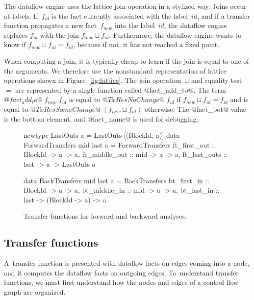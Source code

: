 \documentclass[blockstyle,preprint,nocopyrightspace]{sigplanconf}
\newcommand\join{\sqcup}
\newcommand\seclabel[1]{\label{sec:#1}}
\newcommand\figref[1]{Figure~\ref{fig:#1}}
\newcommand\figlabel[1]{\label{fig:#1}}
\begin{document}
The dataflow engine uses the lattice join operation in a stylized way.
Joins occur at labels.
If~$f_{\mathit{id}}$ is the fact currently associated with the
label~$\mathit{id}$, 
and if a transfer function propagates a new fact~$f_{\mathit{new}}$
into the label~$\mathit{id}$, 
the dataflow engine replaces $f_{\mathit{id}}$ with
the join  $f_{\mathit{new}} \join f_{\mathit{id}}$.
Furthermore, the dataflow engine wants to know if
  $f_{\mathit{new}} \join f_{\mathit{id}} = f_{\mathit{id}}$,
because if not, it has not reached a fixed point.

When computing a join, 
it is typically cheap to learn if the join
is equal to one of the arguments.
We therefore use the nonstandard representation of lattice operations
shown in \figref{lattice}.
The join operation~$\join$ and equality test~$=$ are represented by a
single function called @fact_add_to@.
The term $@fact_add_to@\;f_{\mathit{new}}\;f_{\mathit{id}}$ is equal to
$@TxRes NoChange@\; f_{\mathit{id}}$ if $f_{\mathit{new}} \join f_{\mathit{id}} = f_{\mathit{id}}$
and is equal to
$@TxRes SomeChange@\; (f_{\mathit{new}} \join f_{\mathit{id}})$ otherwise.
The @fact_bot@ value is the bottom element, 
and @fact_name@  is used for debugging.

\begin{figure}
\begin{code}
newtype LastOuts a = LastOuts [(BlockId, a)]
data ForwardTransfers mid last a = ForwardTransfers
 {ft_first_out  :: BlockId -> a -> a,
  ft_middle_out :: mid     -> a -> a,
  ft_last_outs  :: last    -> a -> LastOuts a} 

data BackTransfers mid last a = BackTransfers
 {bt_first_in  :: BlockId -> a              -> a,
  bt_middle_in :: mid     -> a              -> a,
  bt_last_in   :: last    -> (BlockId -> a) -> a} 
\end{code}
\caption{Transfer functions for forward and backward analyses.}
\figlabel{transfers}
%
%
\end{figure}



\subsection{Transfer functions} \seclabel{tffuns}

A~transfer function is presented with dataflow facts on edges coming
into a node, and it computes the dataflow facts on outgoing edges.
To~understand transfer functions, we must first
understand how the nodes and edges of a control-flow graph are organized.
\end{document}
